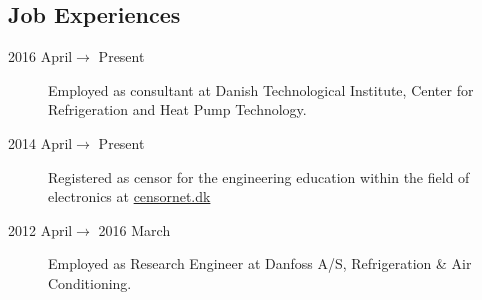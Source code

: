\documentclass[margin,line,a4paper]{resume}
\begin{document}
\begin{resume}
    
\section{\mysidestyle Job Experiences}\vspace{1mm}
\begin{description}
\item[2016 April$\rightarrow$ Present] Employed as consultant at Danish Technological Institute, Center for Refrigeration and Heat Pump Technology.

   \item[2014 April$\rightarrow$ Present] Registered as censor for the engineering education within the field of electronics at \href{https://www.censornet.dk/welcome.htm}{censornet.dk}
    
    \item[2012 April$\rightarrow$ 2016 March] Employed as Research Engineer at Danfoss A/S, Refrigeration \& Air Conditioning. %


\end{description}
\end{resume}
\end{document}
